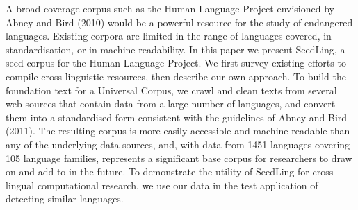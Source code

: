 A broad-coverage corpus such as the Human Language Project envisioned by Abney and Bird (2010) would be a powerful resource for the study of endangered languages. Existing corpora are limited in the range of languages covered, in standardisation, or in machine-readability. In this paper we present SeedLing, a seed corpus for the Human Language Project. We first survey existing efforts to compile cross-linguistic resources, then describe our own approach. To build the foundation text for a Universal Corpus, we crawl and clean texts from several web sources that contain data from a large number of languages, and convert them into a standardised form consistent with the guidelines of Abney and Bird (2011). The resulting corpus is more easily-accessible and machine-readable than any of the underlying data sources, and, with data from 1451 languages covering 105 language families, represents a significant base corpus for researchers to draw on and add to in the future. To demonstrate the utility of SeedLing for cross-lingual computational research, we use our data in the test application of detecting similar languages.
